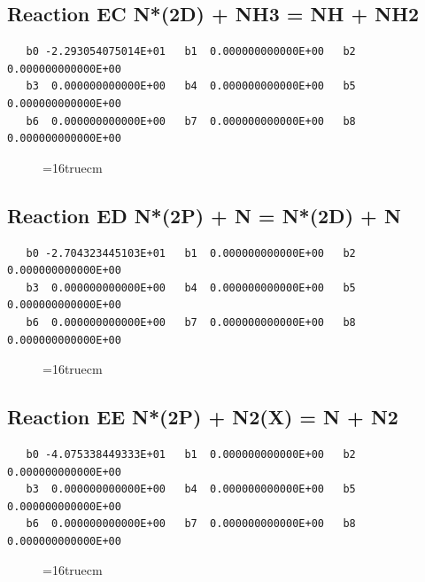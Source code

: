 \documentclass[12pt,dvipdfm]{article}
\begin{document}
\subsection{
Reaction EC N*(2D) + NH3 = NH + NH2 }
\begin{small}\begin{verbatim}
   b0 -2.293054075014E+01   b1  0.000000000000E+00   b2  0.000000000000E+00
   b3  0.000000000000E+00   b4  0.000000000000E+00   b5  0.000000000000E+00
   b6  0.000000000000E+00   b7  0.000000000000E+00   b8  0.000000000000E+00
\end{verbatim}\end{small}
\begin{figure}[h!] \label{n2rates}
\epsfxsize=16truecm
\end{figure}
\newpage

\subsection{
Reaction ED N*(2P) + N = N*(2D) + N }
\begin{small}\begin{verbatim}
   b0 -2.704323445103E+01   b1  0.000000000000E+00   b2  0.000000000000E+00
   b3  0.000000000000E+00   b4  0.000000000000E+00   b5  0.000000000000E+00
   b6  0.000000000000E+00   b7  0.000000000000E+00   b8  0.000000000000E+00
\end{verbatim}\end{small}
\begin{figure}[h!] \label{n2rates}
\epsfxsize=16truecm
\end{figure}
\newpage

\subsection{
Reaction EE N*(2P) + N2(X) = N + N2 }
\begin{small}\begin{verbatim}
   b0 -4.075338449333E+01   b1  0.000000000000E+00   b2  0.000000000000E+00
   b3  0.000000000000E+00   b4  0.000000000000E+00   b5  0.000000000000E+00
   b6  0.000000000000E+00   b7  0.000000000000E+00   b8  0.000000000000E+00
\end{verbatim}\end{small}
\begin{figure}[h!] \label{n2rates}
\epsfxsize=16truecm
\end{figure}
\newpage
\end{document}
